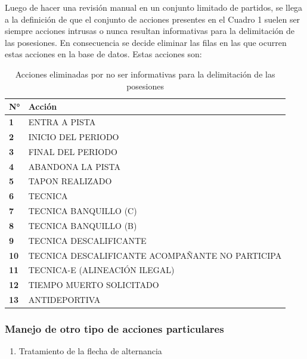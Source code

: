 \documentclass[
  12pt,
]{article}
\providecommand{\tightlist}{%
  \setlength{\itemsep}{0pt}\setlength{\parskip}{0pt}}
\begin{document}
Luego de hacer una revisión manual en un conjunto limitado de partidos,
se llega a la definición de que el conjunto de acciones presentes en el
Cuadro 1 suelen ser siempre acciones intrusas o nunca resultan
informativas para la delimitación de las posesiones. En consecuencia se
decide eliminar las filas en las que ocurren estas acciones en la base
de datos. Estas acciones son:

\begin{table}[H]
\centering
\caption{\label{tab:unnamed-chunk-10}Acciones eliminadas por no ser informativas para la delimitación de las posesiones}
\centering
\fontsize{11}{13}\selectfont
\begin{tabular}[t]{>{\raggedleft\arraybackslash}p{1.5cm}>{\raggedright\arraybackslash}p{12cm}}
\toprule
N° & Acción\\
\midrule
\textbf{1} & ENTRA A PISTA\\
\textbf{2} & INICIO DEL PERIODO\\
\textbf{3} & FINAL DEL PERIODO\\
\textbf{4} & ABANDONA LA PISTA\\
\textbf{5} & TAPON REALIZADO\\
\textbf{6} & TECNICA\\
\textbf{7} & TECNICA BANQUILLO (C)\\
\textbf{8} & TECNICA BANQUILLO (B)\\
\textbf{9} & TECNICA DESCALIFICANTE\\
\textbf{10} & TECNICA DESCALIFICANTE ACOMPAÑANTE NO PARTICIPA\\
\textbf{11} & TECNICA-E (ALINEACIÓN ILEGAL)\\
\textbf{12} & TIEMPO MUERTO SOLICITADO\\
\textbf{13} & ANTIDEPORTIVA\\
\bottomrule
\end{tabular}
\end{table}

\subsubsection{Manejo de otro tipo de acciones
particulares}\label{manejo-de-otro-tipo-de-acciones-particulares}

\begin{enumerate}
\def\labelenumi{\arabic{enumi})}
\tightlist
\item
  Tratamiento de la flecha de alternancia
\end{enumerate}
\end{document}

